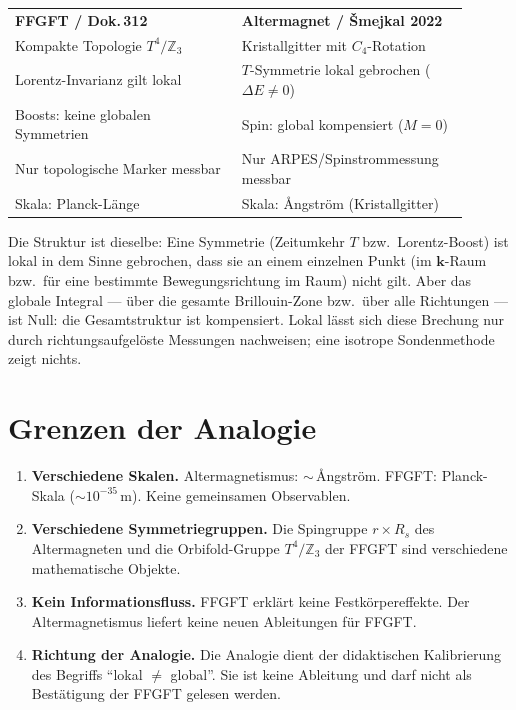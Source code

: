 \begin{tcolorbox}[ffgftbox,title={Strukturvergleich mit Dok.\,312 §\,Lorentz}]
\begin{tabular}{p{0.45\linewidth}p{0.45\linewidth}}
\textbf{FFGFT / Dok.\,312} & \textbf{Altermagnet / Šmejkal 2022}\\[4pt]
Kompakte Topologie $T^4/\mathbb{Z}_3$ & Kristallgitter mit $C_4$-Rotation\\[2pt]
Lorentz-Invarianz gilt lokal & $T$-Symmetrie lokal gebrochen ($\Delta E \neq 0$)\\[2pt]
Boosts: keine globalen Symmetrien & Spin: global kompensiert ($M=0$)\\[2pt]
Nur topologische Marker messbar & Nur ARPES/Spinstrommessung messbar\\[2pt]
Skala: Planck-Länge & Skala: Ångström (Kristallgitter)
\end{tabular}
\end{tcolorbox}

Die Struktur ist dieselbe: Eine Symmetrie (Zeitumkehr $T$ bzw.\ Lorentz-Boost)
ist lokal in dem Sinne gebrochen, dass sie an einem einzelnen Punkt
(im $\mathbf{k}$-Raum bzw.\ für eine bestimmte Bewegungsrichtung im Raum)
nicht gilt. Aber das globale Integral — über die gesamte Brillouin-Zone
bzw.\ über alle Richtungen — ist Null: die Gesamtstruktur ist
kompensiert. Lokal lässt sich diese Brechung nur durch
richtungsaufgelöste Messungen nachweisen; eine isotrope Sondenmethode
zeigt nichts.

\section{Grenzen der Analogie \E}

\begin{tcolorbox}[warnbox,title={Einschränkungen — explizit}]
\begin{enumerate}
  \item \textbf{Verschiedene Skalen.} Altermagnetismus: $\sim$\,\AA ngström.
    FFGFT: Planck-Skala ($\sim 10^{-35}$\,m). Keine gemeinsamen Observablen.
  \item \textbf{Verschiedene Symmetriegruppen.} Die Spingruppe $r \times R_s$
    des Altermagneten und die Orbifold-Gruppe $T^4/\mathbb{Z}_3$
    der FFGFT sind verschiedene mathematische Objekte.
  \item \textbf{Kein Informationsfluss.} FFGFT erklärt keine Festkörpereffekte.
    Der Altermagnetismus liefert keine neuen Ableitungen für FFGFT.
  \item \textbf{Richtung der Analogie.} Die Analogie dient der
    didaktischen Kalibrierung des Begriffs \enquote{lokal $\neq$ global}.
    Sie ist keine Ableitung und darf nicht als Bestätigung der FFGFT
    gelesen werden.
\end{enumerate}
\end{tcolorbox}


